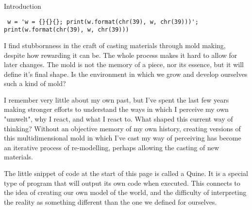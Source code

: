 
\begin{center}
\vspace*{\fill}
\Huge{Introduction}

\vspace{2cm}

\begin{flushright}
\footnotesize \begin{verbatim}
 w = 'w = {}{}{}; print(w.format(chr(39), w, chr(39)))'; print(w.format(chr(39), w, chr(39)))
\end{verbatim} \normalsize
\end{flushright}

\vspace*{\fill}
\end{center}



I find stubbornness in the craft of casting materials through mold making, despite how rewarding it can be. The whole process makes it hard to allow for later changes. The mold is not the memory of a piece, nor its essence, but it will define it's final shape. Is the environment in which we grow and develop ourselves such a kind of mold? 

I remember very little about my own past, but I’ve spent the last few years making stronger efforts to understand the ways in which I perceive my own "umwelt", why I react, and what I react to. What shaped this current way of thinking? Without an objective memory of my own history, creating versions of this multidimensional mold in which I’ve cast my way of perceiving has become an iterative process of re-modelling, perhaps allowing the casting of new materials.


The little snippet of code at the start of this page is called a Quine. It is a special type of program that will output its own code when executed. 
This connects to the idea of creating our own model of the world, and the difficulty of interpreting the reality as something different than the one we defined for ourselves. 
